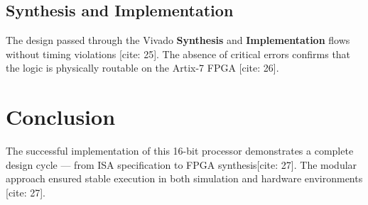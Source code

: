 \documentclass[12pt]{article}
\begin{document}
\subsection{Synthesis and Implementation}
The design passed through the Vivado \textbf{Synthesis} and \textbf{Implementation}
flows without timing violations \cite{xilinx2026}[cite: 25]. The absence of critical errors
confirms that the logic is physically routable on the Artix-7 FPGA \cite{xilinx2026}[cite: 26].

\section{Conclusion}
The successful implementation of this 16-bit processor demonstrates a complete design
cycle — from ISA specification to FPGA synthesis[cite: 27]. The modular approach ensured stable
execution in both simulation and hardware environments \cite{patterson2020, xilinx2026}[cite: 27].

\printbibliography
\end{document}
